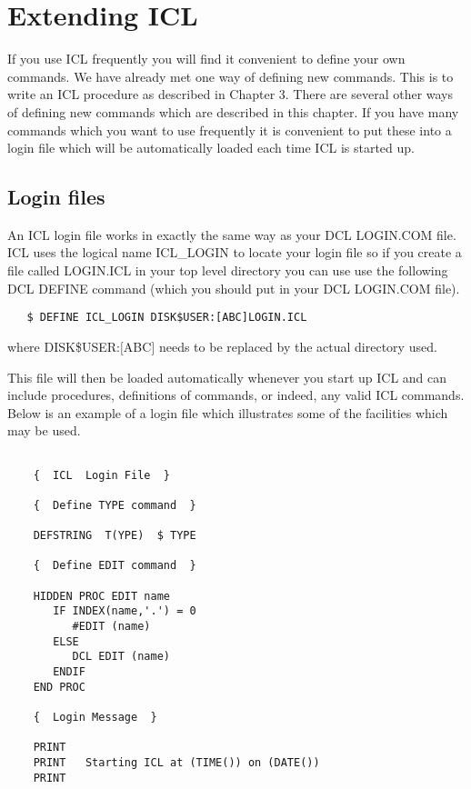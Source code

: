 \documentclass[twoside,11pt]{report}
\newcommand{\xlabel}[1]{}
\begin{document}
\chapter{\xlabel{extending_icl}Extending ICL}

If you use ICL frequently you will find it convenient to define your own
commands. We have already met one way of defining new commands. This is
to write an ICL procedure as described in Chapter 3. There are several other
ways of defining new commands which are described in this chapter. If you
have many commands which you want to use frequently it is convenient to
put these into a login file which will be automatically loaded each time
ICL is started up.

\section{\xlabel{login_files}Login files}

An ICL login file works in exactly the same way as your DCL LOGIN.COM file. ICL
uses the logical name ICL\_LOGIN to locate your login file so if you create a
file called LOGIN.ICL in your top level directory you can use use the following
DCL DEFINE command (which you should put in your DCL LOGIN.COM file).
\begin{verbatim}
   $ DEFINE ICL_LOGIN DISK$USER:[ABC]LOGIN.ICL
\end{verbatim}
where DISK\$USER:$[$ABC$]$ needs to be replaced by the actual directory used.

This file will then be loaded automatically whenever you start up ICL and
can include procedures, definitions of commands, or indeed, any valid ICL
commands. Below is an example of a login file which illustrates some of
the facilities which may be used.
\begin{verbatim}

    {  ICL  Login File  }

    {  Define TYPE command  }

    DEFSTRING  T(YPE)  $ TYPE

    {  Define EDIT command  }

    HIDDEN PROC EDIT name
       IF INDEX(name,'.') = 0
          #EDIT (name)
       ELSE
          DCL EDIT (name)
       ENDIF
    END PROC

    {  Login Message  }

    PRINT
    PRINT   Starting ICL at (TIME()) on (DATE())
    PRINT

\end{verbatim}
\end{document}
